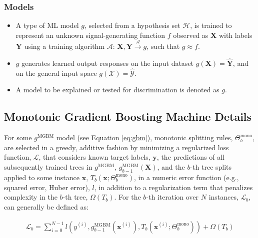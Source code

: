 \documentclass[information,article,submit,moreauthors,pdftex]{definitions/mdpi}
\begin{document}
\subsubsection{Models}

\begin{itemize}[leftmargin=*,labelsep=5.8mm]
	\item A type of ML model $g$, selected from a hypothesis set $\mathcal{H}$, is trained to represent an unknown signal-generating function $f$ observed as  $\mathbf{X}$ with labels $\mathbf{Y}$ using a training algorithm $\mathcal{A}$: 
	$ \mathbf{X}, \mathbf{Y} \xrightarrow{\mathcal{A}} g$, such that $g \approx f$.
	\item $g$ generates learned output responses on the input dataset $g(\mathbf{X}) = \mathbf{\hat{Y}}$, and on the general input space $g(\mathcal{X}) = \mathcal{\hat{Y}}$.
	\item A model to be explained or tested for discrimination is denoted as $g$.
\end{itemize}

\subsection{Monotonic Gradient Boosting Machine Details}\label{a_ssec:mgbm}

\noindent For some $g^\text{MGBM}$ model (see Equation \ref{eq:gbm}), monotonic splitting rules, $\Theta^{\text{mono}}_b$, are selected in a greedy, additive fashion by minimizing a regularized loss function, $\mathcal{L}$,  that considers known target labels, $\mathbf{y}$, the predictions of all subsequently trained trees in $g^{\text{MGBM}}$, $g^{\text{MGBM}}_{b-1}(\mathbf{X})$, and the $b$-th tree splits applied to some instance $\mathbf{x}$, $T_b(\mathbf{x};\Theta^\text{mono}_b)$, in a numeric error function (e.g., squared error, Huber error), $l$, in addition to a regularization term that penalizes complexity in the $b$-th tree, $\Omega(T_b)$. For the $b$-th iteration over $N$ instances, $\mathcal{L}_{b}$, can generally be defined as:

\begin{equation}
\begin{aligned}
\mathcal{L}_{b} =\sum_{i=0}^{N-1}l(y^{(i)}, g^{\text{MGBM}}_{b-1}(\mathbf{x}^{(i)}), T_b(\mathbf{x}^{(i)};\Theta^\text{mono}_b)) + \Omega(T_b)\\
\end{aligned}
\end{equation}
\end{document}

